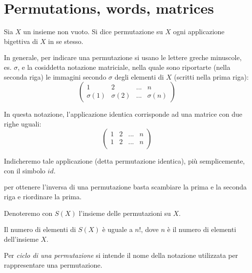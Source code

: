\chapter{Permutations, words, matrices}

\begin{definizione}
Sia $X$ un insieme non vuoto. Si dice permutazione su $X$ ogni applicazione bigettiva di $X$ in se stesso.
\end{definizione}

In generale, per indicare una permutazione si usano le lettere greche minuscole, es. $\sigma$, e la cosiddetta notazione matriciale,
nella quale sono riportarte (nella seconda riga) le immagini secondo $\sigma$ degli elementi di $X$ (scritti nella prima riga):
\[
\left(
 \begin{array}{cccc}
  1 & 2 & ... & n \\
  \sigma(1) & \sigma(2) & ... & \sigma(n)
 \end{array}
\right)
\] 

\begin{definizione}
In questa notazione, l'applicazione identica corrisponde ad una matrice con due righe uguali:
\[
\left(
 \begin{array}{cccc}
  1 & 2 & ... & n \\
  1 & 2 & ... & n \\
 \end{array}
\right)
\]
\end{definizione}

Indicheremo tale applicazione (detta permutazione identica), più semplicemente, con il simbolo $id$. 

\begin{definizione}
per ottenere l’inversa di una permutazione basta scambiare la prima e la seconda riga e riordinare la prima. 
\end{definizione}

\begin{definizione}
Denoteremo con $S(X)$ l'insieme delle permutazioni su $X$. 
\end{definizione}

Il numero di elementi di $S(X)$ è uguale a $n!$, dove $n$ è il numero di elementi dell'insieme $X$.

\begin{definizione}
Per \textit{ciclo di una permutazione} si intende il nome della notazione utilizzata per rappresentare una permutazione.
\end{definizione}

